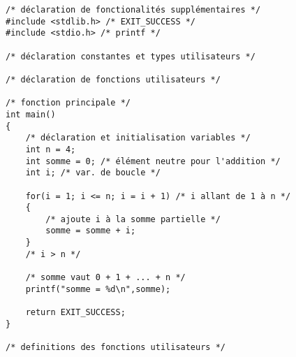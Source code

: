 \begin{correction}
\begin{verbatim}
/* déclaration de fonctionalités supplémentaires */
#include <stdlib.h> /* EXIT_SUCCESS */
#include <stdio.h> /* printf */

/* déclaration constantes et types utilisateurs */

/* déclaration de fonctions utilisateurs */

/* fonction principale */
int main()
{
    /* déclaration et initialisation variables */
    int n = 4;
    int somme = 0; /* élément neutre pour l'addition */
    int i; /* var. de boucle */

    for(i = 1; i <= n; i = i + 1) /* i allant de 1 à n */
    {
        /* ajoute i à la somme partielle */
        somme = somme + i;
    }
    /* i > n */

    /* somme vaut 0 + 1 + ... + n */
    printf("somme = %d\n",somme);

    return EXIT_SUCCESS;
}

/* definitions des fonctions utilisateurs */
\end{verbatim}
\end{correction}


